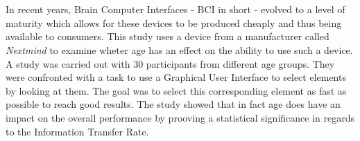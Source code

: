 



\usepackage[utf8]{inputenc} %





\newcommand{\vorname}{Julius}
\newcommand{\nachname}{Neudecker}
\newcommand{\matrikelnummer}{2025850}

\newcommand{\titel}{{The influence of age on the ability to use Brain-Computer-Interfaces}\\[0.2ex] 
				\Large Use-case: TV remote control}

\newcommand{\erstpruef}{Prof. Dr.Roland Greule}
\newcommand{\zweitpruef}{Dipl. Inf. Rüdiger Höfert}

\date{preliminary version from \today}   %



    \maketitle
    \tableofcontents
    \clearpage          %


    \thispagestyle{empty}
    \section*{\centering\abstractname}
    In recent years, Brain Computer Interfaces - BCI in short - evolved to a level of maturity which allows for these devices to be produced cheaply and thus being available to consumers. This study uses a device from a manufacturer called \textit{Nextmind} to examine wheter age has an effect on the ability to use such a device. A study was carried out with 30 participants from different age groups. They were confronted with a task to use a Graphical User Interface to select elements by looking at them. The goal was to select this corresponding element as fast as possible to reach good results. The study showed that in fact age does have an impact on the overall performance by prooving a statistical significance in regards to the Information Transfer Rate. 

